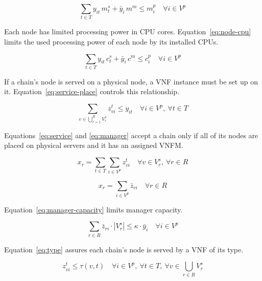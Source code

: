 \begin{equation}\label{eq:node-memory}
\sum_{t \in T} y_{it}\, m^s_t + \bar{y}_i\, m^m \le m^p_i \quad \forall i \in V^p
\end{equation}

Each node has limited processing power in CPU cores.
Equation~\eqref{eq:node-cpu} limits the used processing power of each node by its
installed CPUs.

\begin{equation}\label{eq:node-cpu}
\sum_{t \in T} y_{it}\, c^s_t + \bar{y}_i\, c^m \le c^p_i \quad \forall i \in V^p
\end{equation}

If a chain's node is served on a physical node, a VNF instance must be set up on
it. Equation~\eqref{eq:service-place} controls this relationship.

\begin{equation}\label{eq:service-place}
\sum_{v \in \bigcup_{r=1}^{R} V^s_r} z^t_{vi} \le y_{it}
\quad \forall i \in V^p,\ \forall t \in T
\end{equation}

Equations~\eqref{eq:service} and \eqref{eq:manager} accept a chain only if all of
its nodes are placed on physical servers and it has an assigned VNFM.

\begin{equation}\label{eq:service}
x_r = \sum_{t \in T} \sum_{i \in V^p} z^t_{vi}
\quad \forall v \in V^s_r,\ \forall r \in R
\end{equation}

\begin{equation}\label{eq:manager}
x_r = \sum_{i \in V^p} \bar{z}_{ri} \quad \forall r \in R
\end{equation}

Equation~\eqref{eq:manager-capacity} limits manager capacity.

\begin{equation}\label{eq:manager-capacity}
\sum_{r \in R} \bar{z}_{ri} \cdot |V^s_r| \le \kappa \cdot \bar{y}_i
\quad \forall i \in V^p
\end{equation}

Equation~\eqref{eq:type} assures each chain's node is served by a VNF of its type.

\begin{equation}\label{eq:type}
z^t_{vi} \le \tau(v, t)
\quad \forall i \in V^p,\ \forall t \in T,\ \forall v \in \bigcup_{r \in R} V^s_r
\end{equation}

